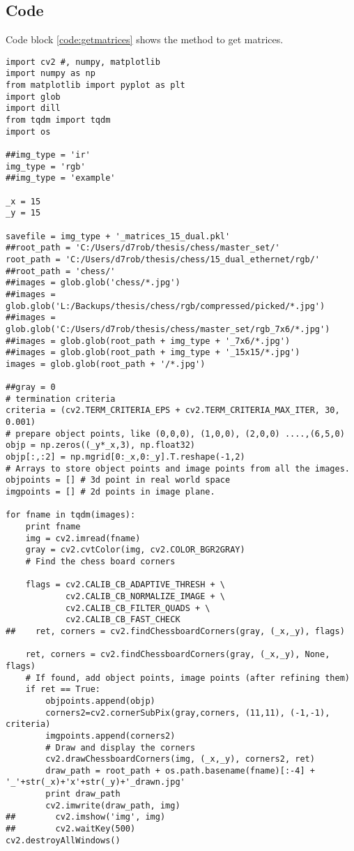 \begin{appendices}

\chapter{Code}

Code block \ref{code:getmatrices} shows the method to get matrices.

\begin{lstlisting}
import cv2 #, numpy, matplotlib
import numpy as np
from matplotlib import pyplot as plt
import glob
import dill
from tqdm import tqdm
import os

##img_type = 'ir'
img_type = 'rgb'
##img_type = 'example'

_x = 15
_y = 15

savefile = img_type + '_matrices_15_dual.pkl'
##root_path = 'C:/Users/d7rob/thesis/chess/master_set/'
root_path = 'C:/Users/d7rob/thesis/chess/15_dual_ethernet/rgb/'
##root_path = 'chess/'
##images = glob.glob('chess/*.jpg')
##images = glob.glob('L:/Backups/thesis/chess/rgb/compressed/picked/*.jpg')
##images = glob.glob('C:/Users/d7rob/thesis/chess/master_set/rgb_7x6/*.jpg')
##images = glob.glob(root_path + img_type + '_7x6/*.jpg')
##images = glob.glob(root_path + img_type + '_15x15/*.jpg')
images = glob.glob(root_path + '/*.jpg')

##gray = 0
# termination criteria
criteria = (cv2.TERM_CRITERIA_EPS + cv2.TERM_CRITERIA_MAX_ITER, 30, 0.001)
# prepare object points, like (0,0,0), (1,0,0), (2,0,0) ....,(6,5,0)
objp = np.zeros((_y*_x,3), np.float32)
objp[:,:2] = np.mgrid[0:_x,0:_y].T.reshape(-1,2)
# Arrays to store object points and image points from all the images.
objpoints = [] # 3d point in real world space
imgpoints = [] # 2d points in image plane.

for fname in tqdm(images):
    print fname
    img = cv2.imread(fname)
    gray = cv2.cvtColor(img, cv2.COLOR_BGR2GRAY)
    # Find the chess board corners
    
    flags = cv2.CALIB_CB_ADAPTIVE_THRESH + \
            cv2.CALIB_CB_NORMALIZE_IMAGE + \
            cv2.CALIB_CB_FILTER_QUADS + \
            cv2.CALIB_CB_FAST_CHECK
##    ret, corners = cv2.findChessboardCorners(gray, (_x,_y), flags)

    ret, corners = cv2.findChessboardCorners(gray, (_x,_y), None, flags)
    # If found, add object points, image points (after refining them)
    if ret == True:
        objpoints.append(objp)
        corners2=cv2.cornerSubPix(gray,corners, (11,11), (-1,-1), criteria)
        imgpoints.append(corners2)
        # Draw and display the corners
        cv2.drawChessboardCorners(img, (_x,_y), corners2, ret)
        draw_path = root_path + os.path.basename(fname)[:-4] + '_'+str(_x)+'x'+str(_y)+'_drawn.jpg'
        print draw_path
        cv2.imwrite(draw_path, img)
##        cv2.imshow('img', img)
##        cv2.waitKey(500)
cv2.destroyAllWindows()


\end{lstlisting}
\end{appendices}
